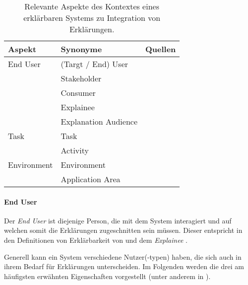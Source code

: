 \begin{table}[bht!]
    \begin{tabular}{|p{}|p{}|p{}|}
        \hline
        \textbf{Aspekt} & \textbf{Synonyme} & \textbf{Quellen} \\ \hline
        End User        &  (Targt / End)  User & \cite{chazette2020explainability} \cite{kaptein_personalised_2017} \cite{sokol_one_2020} \cite{wiegand_id_2020} \\
                        & Stakeholder & \cite{chazette_knowledge_nodate} \\
                        & Consumer & \cite{ehsan_human-centered_2020} \\
                        & Explainee & \cite{chazette_knowledge_nodate} \cite{kohl_explainability_2019} \\
                        & Explanation Audience & \cite{sokol_explainability_2020} \\
        \hline
        Task            & Task & \cite{chazette_knowledge_nodate} \cite{sokol_explainability_2020} \cite{gunning2019darpa} \\
                        & Activity & \cite{wohlin2012experimentation} \\
        \hline
        Environment     & Environment & \cite{chazette_knowledge_nodate} \cite{wiegand_id_2020} \cite{wiegand2019drive} \\
                        & Application Area & \cite{sokol_explainability_2020} \cite{wiegand2019drive} \cite{wiegand_id_2020} \\
        \hline
    \end{tabular}
    \caption{Relevante Aspekte des Kontextes eines erklärbaren Systems zu Integration von Erklärungen.}
    \label{tab:impact_of_context_on_explanation}
\end{table}

\paragraph{End User} Der \textit{End User} ist diejenige Person, die mit dem System interagiert und auf welchen somit die Erklärungen zugeschnitten sein müssen. Dieser entspricht in den Definitionen von Erklärbarkeit von \citeauthor{chazette_knowledge_nodate} und \citeauthor{kohl_explainability_2019} dem \textit{Explainee} \cite{chazette_knowledge_nodate,kohl_explainability_2019}.

Generell kann ein System verschiedene Nutzer(-typen) haben, die sich auch in ihrem Bedarf für Erklärungen unterscheiden. Im Folgenden werden die drei am häufigsten erwähnten Eigenschaften vorgestellt (unter anderem in \cite{chazette_knowledge_nodate,tintarev_designing_nodate,yamada_evaluating_2016}).


